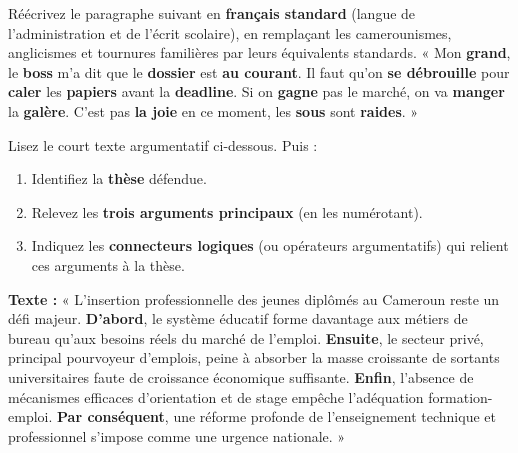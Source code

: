 \documentclass[11pt]{article}
\newcounter{popsec}
\newcounter{popsub}
\newcommand{\courssub}[1]{%
  \stepcounter{popsub}%
  \par\vspace{9pt}\noindent{\popxbold\fontsize{11.5}{13}\selectfont\color{popink}{\color{poporange}\thepopsec.\thepopsub}\hspace{6pt}#1}\par\nopagebreak\vspace{4pt}
}
\begin{document}
\begin{exercice}
Réécrivez le paragraphe suivant en \textbf{français standard} (langue de l'administration et de l'écrit scolaire), en remplaçant les camerounismes, anglicismes et tournures familières par leurs équivalents standards.
« Mon \textbf{grand}, le \textbf{boss} m'a dit que le \textbf{dossier} est \textbf{au courant}. Il faut qu'on \textbf{se débrouille} pour \textbf{caler} les \textbf{papiers} avant la \textbf{deadline}. Si on \textbf{gagne} pas le marché, on va \textbf{manger} la \textbf{galère}. C'est pas \textbf{la joie} en ce moment, les \textbf{sous} sont \textbf{raides}. »
\end{exercice}

\begin{exercice}
Lisez le court texte argumentatif ci-dessous. Puis :
\begin{enumerate}
    \item Identifiez la \textbf{thèse} défendue.
    \item Relevez les \textbf{trois arguments principaux} (en les numérotant).
    \item Indiquez les \textbf{connecteurs logiques} (ou opérateurs argumentatifs) qui relient ces arguments à la thèse.
\end{enumerate}
\textbf{Texte :} « L'insertion professionnelle des jeunes diplômés au Cameroun reste un défi majeur. \textbf{D'abord}, le système éducatif forme davantage aux métiers de bureau qu'aux besoins réels du marché de l'emploi. \textbf{Ensuite}, le secteur privé, principal pourvoyeur d'emplois, peine à absorber la masse croissante de sortants universitaires faute de croissance économique suffisante. \textbf{Enfin}, l'absence de mécanismes efficaces d'orientation et de stage empêche l'adéquation formation-emploi. \textbf{Par conséquent}, une réforme profonde de l'enseignement technique et professionnel s'impose comme une urgence nationale. »
\end{exercice}

\courssub{Je me prépare au Bac}
\end{document}
